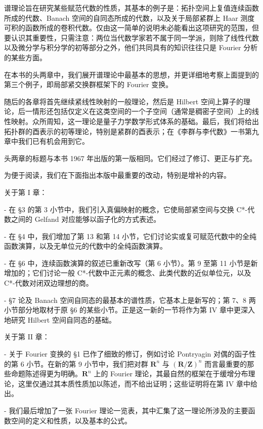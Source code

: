 
谱理论旨在研究某些赋范代数的性质，其基本的例子是：拓扑空间上复值连续函数所成的代数、Banach 空间的自同态所成的代数，以及关于局部紧群上 Haar 测度可积的函数所成的卷积代数。仅由这一简单的说明未必能看出这项研究的范围，但要认识其重要性，只需注意：两位当代数学家若不属于同一学派，则除了线性代数以及微分学与积分学的初等部分之外，他们共同具有的知识往往只是 Fourier 分析的某些方面。

在本书的头两章中，我们展开谱理论中最基本的思想，并更详细地考察上面提到的第三个例子，即局部紧交换群框架下的 Fourier 变换。

随后的各章将首先继续紧线性映射的一般理论，然后是 Hilbert 空间上算子的理论，后一情形还包括仅定义在这类空间的一个子空间（通常是稠密子空间）上的线性映射。众所周知，这一理论是量子力学数学形式体系的基础。最后，我们将给出拓扑群的酉表示的初等理论，特别是紧群的酉表示；在《李群与李代数》一书第九章中我们已有机会用到它。

头两章的标题与本书 1967 年出版的第一版相同。它们经过了修订、更正与扩充。

为便于阅读，我们在下面指出本版中最重要的改动，特别是增补的内容。

关于第 I 章：

- 在 §3 的第 3 小节中，我们引入真偏映射的概念，它使局部紧空间与交换 C*-代数之间的 Gelfand 对应能够以函子化的方式表述。

- 在 §4 中，我们增加了第 13 和第 14 小节，它们讨论实或复可赋范代数中的全纯函数演算，以及无单位元的代数中的全纯函数演算。

- 在 §6 中，连续函数演算的叙述已重新改写（第 6 小节）。第 9 至第 11 小节是新增加的；它们讨论一般 C*-代数中正元素的概念、此类代数的近似单位元，以及 C*-代数对闭双边理想的商。

- §7 论及 Banach 空间自同态的最基本的谱性质，它基本上是新写的；第 7、8 两小节部分地取材于原 §6 的某些小节。正是这一新的一节将作为第 IV 章中更深入地研究 Hilbert 空间自同态的基础。

关于第 II 章：

- 关于 Fourier 变换的 §1 已作了细致的修订，例如讨论 Pontryagin 对偶的函子性的第 6 小节。在新的第 9 小节中，我们把对群 \(\mathbf{R}^n\) 与 \((\mathbf{R}/\mathbf{Z})^n\) 而言最重要的那些命题陈述得更为明确。\(\mathbf{R}^n\) 上的 Fourier 理论，其最自然的框架在于缓增分布理论，这里仅通过其本质性质加以陈述，而不给出证明；这些证明将在第 IV 章中给出。

- 我们最后增加了一张 Fourier 理论一览表，其中汇集了这一理论所涉及的主要函数空间的定义和性质，以及基本的公式。

